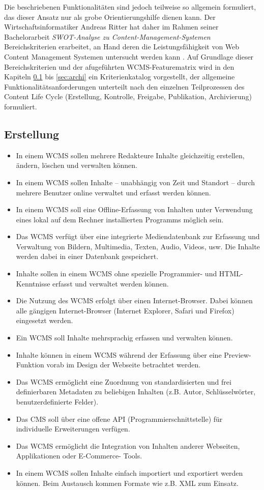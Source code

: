 Die beschriebenen Funktionalitäten sind jedoch teilweise so allgemein formuliert, das dieser Ansatz nur als grobe Orientierungshilfe dienen kann. Der Wirtschaftsinformatiker Andreas Ritter hat daher im Rahmen seiner Bachelorarbeit \emph{SWOT-Analyse zu Content-Management-Systemen} \cite{RitterSwot} Bereichskriterien erarbeitet, an Hand deren die Leistungsfähigkeit von Web Content Management Systemen untersucht werden kann \citep[][Seite 21-23]{RitterSwot}. Auf Grundlage dieser Bereichskriterien und der afugeführten WCMS-Featurematrix wird in den Kapiteln \ref{sec:erstellung} bis \ref{sec:archi} ein Kriterienkatalog vorgestellt, der allgemeine Funktionalitätsanforderungen unterteilt nach den einzelnen Teilprozessen des Content Life Cycle (Erstellung, Kontrolle, Freigabe, Publikation, Archivierung) formuliert.

\subsection{Erstellung}
\label{sec:erstellung}
\begin{itemize}
\item
In einem WCMS sollen mehrere Redakteure Inhalte gleichzeitig erstellen, ändern, löschen und verwalten können.
\item
In einem WCMS sollen Inhalte – unabhängig von Zeit und Standort – durch mehrere Benutzer online verwaltet und erfasst werden können.
\item
In einem WCMS soll eine Offline-Erfassung von Inhalten unter Verwendung eines lokal auf dem Rechner installierten Programms möglich sein.
\item
Das WCMS verfügt über eine integrierte Mediendatenbank zur Erfassung und Verwaltung von Bildern, Multimedia, Texten, Audio, Videos, usw. Die Inhalte werden dabei in einer Datenbank gespeichert.
\item
Inhalte sollen in einem WCMS ohne spezielle Programmier- und HTML-Kenntnisse erfasst und verwaltet werden können.
\item
Die Nutzung des WCMS erfolgt über einen Internet-Browser. Dabei können alle gängigen Internet-Browser (Internet Explorer, Safari und Firefox) eingesetzt werden.
\item
Ein WCMS soll Inhalte mehrsprachig erfassen und verwalten können.
\item
Inhalte können in einem WCMS während der Erfassung über eine Preview-Funktion vorab im Design der Webseite betrachtet werden.
\item
Das WCMS ermöglicht eine Zuordnung von standardisierten und frei definierbaren Metadaten zu beliebigen Inhalten (z.B. Autor, Schlüsselwörter, benutzerdefinierte Felder).
\item
Das CMS soll über eine offene API (Programmierschnittstelle) für individuelle Erweiterungen verfügen.
\item
Das WCMS ermöglicht die Integration von Inhalten anderer Webseiten, Applikationen oder E-Commerce- Tools.
\item
In einem WCMS sollen Inhalte einfach importiert und exportiert werden können. Beim Austausch kommen Formate wie z.B. XML zum Einsatz.
\end{itemize}



